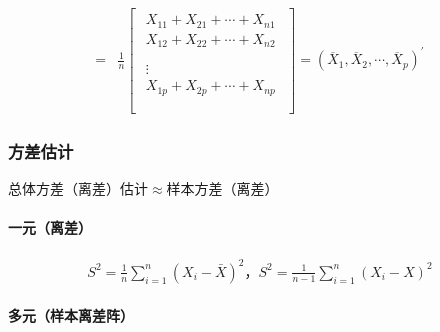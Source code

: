 \documentclass[12pt]{book}
\begin{document}
\begin{align*}
    = & \frac{1}{n} \left[
        \begin{matrix}
            \begin{matrix}
                X_{11}+X_{21}+\cdots+X_{n1} \\
                X_{12}+X_{22}+\cdots+X_{n2} \\
            \end{matrix} \\
            \begin{matrix}
                \vdots                      \\
                X_{1p}+X_{2p}+\cdots+X_{np} \\
            \end{matrix} \\\end{matrix}\right]
    =\left({\overline{X}}_1,{\overline{X}}_2,\cdots,{\overline{X}}_p\right)^\prime
\end{align*}


\subsubsection{方差估计}

总体方差（离差）估计$\approx$样本方差（离差）

\paragraph{一元（离差）}

\begin{gather*}
    S^2=\frac{1}{n}\sum_{i=1}^{n}{(X_i-\bar{X})^2}， S^2=\frac{1}{n-1}\sum_{i=1}^{n}{(X_i-X)^2}
\end{gather*}


\paragraph{多元（样本离差阵）}
\end{document}
